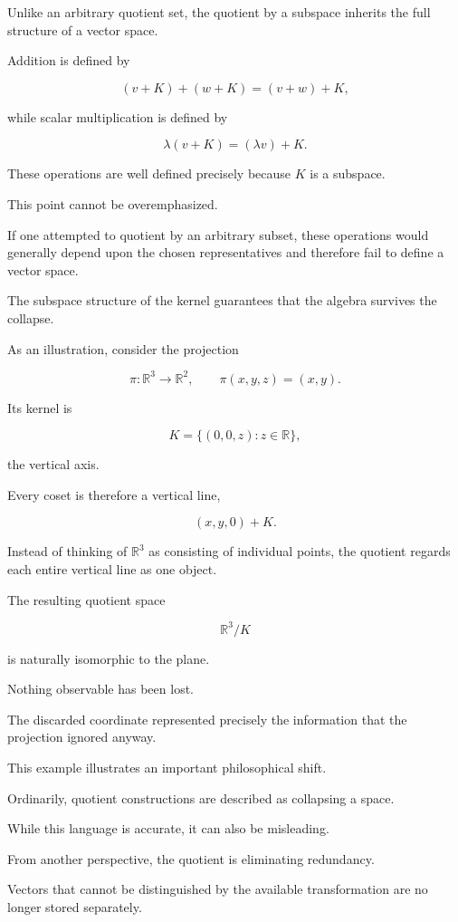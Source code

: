 \documentclass[11pt]{book}
\numberwithin{equation}{chapter}
\theoremstyle{definition}
\theoremstyle{plain}
\theoremstyle{remark}
\begin{document}
Unlike an arbitrary quotient set, the quotient by a subspace inherits the full structure of a vector space.

Addition is defined by

\[
(v+K)+(w+K)
=
(v+w)+K,
\]

while scalar multiplication is defined by

\[
\lambda(v+K)
=
(\lambda v)+K.
\]

These operations are well defined precisely because \(K\) is a subspace.

This point cannot be overemphasized.

If one attempted to quotient by an arbitrary subset, these operations would generally depend upon the chosen representatives and therefore fail to define a vector space.

The subspace structure of the kernel guarantees that the algebra survives the collapse.

As an illustration, consider the projection

\[
\pi:\mathbb{R}^{3}\rightarrow\mathbb{R}^{2},
\qquad
\pi(x,y,z)
=
(x,y).
\]

Its kernel is

\[
K
=
\{
(0,0,z):z\in\mathbb{R}
\},
\]

the vertical axis.

Every coset is therefore a vertical line,

\[
(x,y,0)+K.
\]

Instead of thinking of \(\mathbb{R}^{3}\) as consisting of individual points, the quotient regards each entire vertical line as one object.

The resulting quotient space

\[
\mathbb{R}^{3}/K
\]

is naturally isomorphic to the plane.

Nothing observable has been lost.

The discarded coordinate represented precisely the information that the projection ignored anyway.

This example illustrates an important philosophical shift.

Ordinarily, quotient constructions are described as collapsing a space.

While this language is accurate, it can also be misleading.

From another perspective, the quotient is eliminating redundancy.

Vectors that cannot be distinguished by the available transformation are no longer stored separately.
\end{document}
